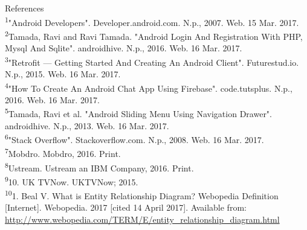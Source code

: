 \documentclass{article}
\begin{document}
\begin{flushleft}
{\huge References}\\[0.5cm]
\textsuperscript{1}"Android Developers". Developer.android.com. N.p., 2007. Web. 15 Mar. 2017.\\
\textsuperscript{2}Tamada, Ravi and Ravi Tamada. "Android Login And Registration With PHP, Mysql And Sqlite". androidhive. N.p., 2016. Web. 16 Mar. 2017.\\
\textsuperscript{3}"Retrofit — Getting Started And Creating An Android Client". Futurestud.io. N.p., 2015. Web. 16 Mar. 2017.\\
\textsuperscript{4}"How To Create An Android Chat App Using Firebase". code.tutsplus. N.p., 2016. Web. 16 Mar. 2017.\\
\textsuperscript{5}Tamada, Ravi et al. "Android Sliding Menu Using Navigation Drawer". androidhive. N.p., 2013. Web. 16 Mar. 2017.\\
\textsuperscript{6}"Stack Overflow". Stackoverflow.com. N.p., 2008. Web. 16 Mar. 2017.\\
\textsuperscript{7}Mobdro. Mobdro, 2016. Print.\\
\textsuperscript{8}Ustream. Ustream an IBM Company, 2016. Print.\\
\textsuperscript{9}10. UK TVNow. UKTVNow; 2015. \\
\textsuperscript{10}1. Beal V. What is Entity Relationship Diagram? Webopedia Definition [Internet]. Webopedia. 2017 [cited 14 April 2017]. Available from: \url {http://www.webopedia.com/TERM/E/entity_relationship_diagram.html}\\
\end{flushleft}
\end{document}
